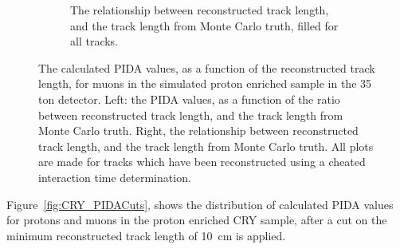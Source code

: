 \begin{figure}
\begin{subfigure}{0.48\textwidth}
        \caption{The relationship between reconstructed track length, and the track length from Monte Carlo truth, filled for all tracks.}
        \label{fig:CRY_MCRecoTrack_Muon_All}
  \end{subfigure}
  \caption[The calculated PIDA values, as a function of the reconstructed track length, for muons in the simulated proton enriched sample in the 35 ton detector]
          {The calculated PIDA values, as a function of the reconstructed track length, for muons in the simulated proton enriched sample in the 35 ton detector. Left: the PIDA values, as a function of the ratio between reconstructed track length, and the track length from Monte Carlo truth. Right, the relationship between reconstructed track length, and the track length from Monte Carlo truth. All plots are made for tracks which have been reconstructed using a cheated interaction time determination.}
  \label{fig:CRY_MuonAllComp}
\end{figure}

Figure~\ref{fig:CRY_PIDACuts}, shows the distribution of calculated PIDA values for protons and muons in the proton enriched CRY sample, after a cut on the minimum reconstructed track length of 10~cm is applied. \\

